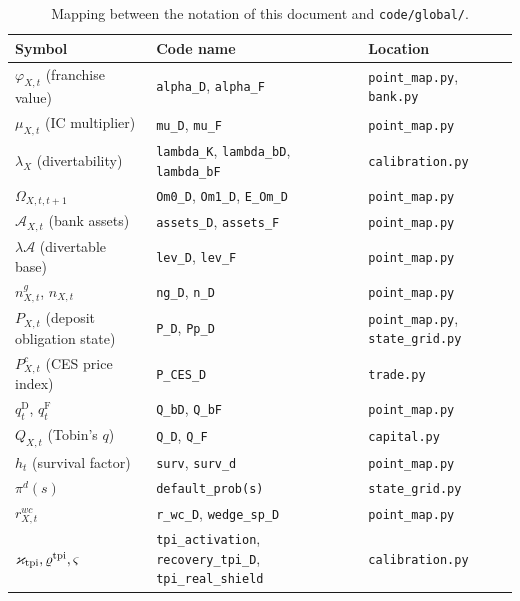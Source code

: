 \documentclass[11pt]{article}
\numberwithin{equation}{section}
\newcommand{\code}[1]{\texttt{\small #1}}
\newcommand{\D}{\mathrm{D}}
\newcommand{\F}{\mathrm{F}}
\theoremstyle{definition}
\theoremstyle{plain}
\theoremstyle{remark}
\begin{document}
\begin{table}[htbp]
\centering
\small
\caption{Mapping between the notation of this document and \code{code/global/}.}
\label{tab:codemap}
\begin{tabular}{@{}l>{\raggedright\arraybackslash}p{5.3cm}l@{}}
\toprule
Symbol & Code name & Location \\
\midrule
$\varphi_{X,t}$ (franchise value)      & \code{alpha\_D}, \code{alpha\_F}        & \code{point\_map.py}, \code{bank.py}\\
$\mu_{X,t}$ (IC multiplier)            & \code{mu\_D}, \code{mu\_F}              & \code{point\_map.py}\\
$\lambda_X$ (divertability)            & \code{lambda\_K}, \code{lambda\_bD}, \code{lambda\_bF} & \code{calibration.py}\\
$\Omega_{X,t,t+1}$                     & \code{Om0\_D}, \code{Om1\_D}, \code{E\_Om\_D} & \code{point\_map.py}\\
$\mathcal{A}_{X,t}$ (bank assets)      & \code{assets\_D}, \code{assets\_F}      & \code{point\_map.py}\\
$\lambda\mathcal{A}$ (divertable base) & \code{lev\_D}, \code{lev\_F}            & \code{point\_map.py}\\
$n^{g}_{X,t}$, $n_{X,t}$               & \code{ng\_D}, \code{n\_D}               & \code{point\_map.py}\\
$P_{X,t}$ (deposit obligation state)   & \code{P\_D}, \code{Pp\_D}               & \code{point\_map.py}, \code{state\_grid.py}\\
$P^{c}_{X,t}$ (CES price index)        & \code{P\_CES\_D}                        & \code{trade.py}\\
$q^{\D}_t$, $q^{\F}_t$                 & \code{Q\_bD}, \code{Q\_bF}              & \code{point\_map.py}\\
$Q_{X,t}$ (Tobin's $q$)                & \code{Q\_D}, \code{Q\_F}                & \code{capital.py}\\
$h_t$ (survival factor)                & \code{surv}, \code{surv\_d}             & \code{point\_map.py}\\
$\pi^{d}(s)$                           & \code{default\_prob(s)}                 & \code{state\_grid.py}\\
$r^{wc}_{X,t}$                         & \code{r\_wc\_D}, \code{wedge\_sp\_D}    & \code{point\_map.py}\\
$\varkappa_{\rm tpi},\varrho^{\rm tpi},\varsigma$ & \code{tpi\_activation}, \code{recovery\_tpi\_D}, \code{tpi\_real\_shield} & \code{calibration.py}\\[2pt]

\end{tabular}
\end{table}
\end{document}
